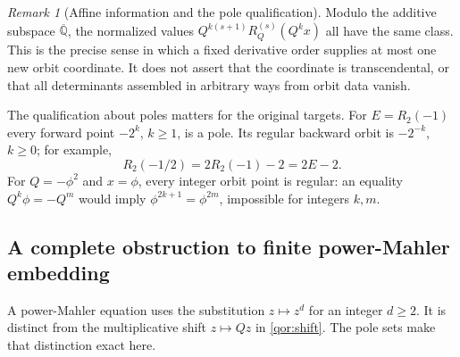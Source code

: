\documentclass[11pt,a4paper]{article}
\theoremstyle{definition}\newtheorem{definition}[theorem]{Definition}
\theoremstyle{remark}\newtheorem{remark}[theorem]{Remark}
\begin{document}
\begin{remark}[Affine information and the pole qualification]
Modulo the additive subspace $\overline{\mathbb Q}$, the normalized
values $Q^{k(s+1)}R_Q^{(s)}(Q^kx)$ all have the same class.  This is
the precise sense in which a fixed derivative order supplies at most
one new orbit coordinate.  It does not assert that the coordinate
is transcendental, or that all determinants assembled in arbitrary
ways from orbit data vanish.

The qualification about poles matters for the original targets.
For $E=R_2(-1)$ every forward point $-2^k$, $k\geq1$, is a pole.
Its regular backward orbit is $-2^{-k}$, $k\geq0$; for example,
\[
 R_2(-1/2)=2R_2(-1)-2=2E-2.
\]
For $Q=-\phi^2$ and $x=\phi$, every integer orbit point is regular:
an equality $Q^k\phi=-Q^m$ would imply
$\phi^{2k+1}=\phi^{2m}$, impossible for integers $k,m$.
\end{remark}

\subsection{A complete obstruction to finite power-Mahler embedding}

A power-Mahler equation uses the substitution $z\mapsto z^d$ for
an integer $d\geq2$.  It is distinct from the multiplicative shift
$z\mapsto Qz$ in \eqref{qor:shift}.  The pole sets make that
distinction exact here.
\end{document}
